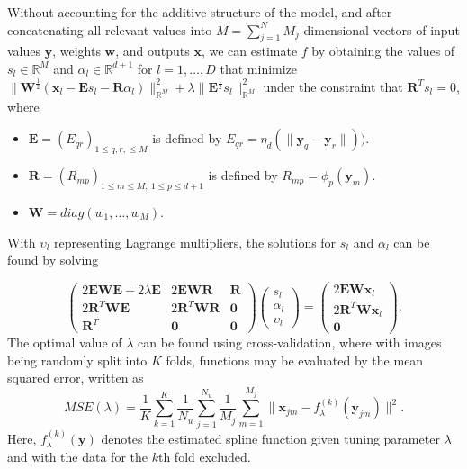 \documentclass[11pt,reqno]{article}
\theoremstyle{definition}
\begin{document}
Without accounting for the additive structure of the model, and after concatenating all relevant values into $M = \sum_{j=1}^{N}M_{j}$-dimensional vectors of input values $\mathbf{y}$, weights $\mathbf{w}$, and outputs $\mathbf{x}$, we can estimate $f$ by obtaining the values of $s_l \in \mathbb{R}^{M}$ and $\alpha_l \in \mathbb{R}^{d + 1}$ for $l = 1, \dots, D$ that minimize $\|\mathbf{W}^{\frac{1}{2}}\left(\mathbf{x}_{l} - \mathbf{E}s_l - \mathbf{R}\alpha_l\right)\|^2_{\mathbb{R}^{M}} + \lambda\|\mathbf{E}^{\frac{1}{2}}s_l\|^2_{\mathbb{R}^{M}}$ under the constraint that $\mathbf{R}^{T}s_l = 0$, where
\begin{itemize}
  \item $\mathbf{E} = (E_{qr})_{1 \leq q, r, \leq M}$ is defined by $E_{qr} = \eta_{d}\left(\|\mathbf{y}_{q} - \mathbf{y}_{r}\|\right))$.
  \item $\mathbf{R} = \left(R_{mp}\right)_{1 \leq m \leq M, \ 1 \leq p \leq d + 1}$ is defined by $R_{mp} = \phi_p(\mathbf{y}_{m})$.
  \item $\mathbf{W} = diag(w_{1}, \dots, w_{M})$.
\end{itemize}

With $\upsilon_l$ representing Lagrange multipliers, the solutions for $s_l$ and $\alpha_l$ can be found by solving

\begin{equation}
   \left(\begin{array}{ccc}
    2\mathbf{EWE} + 2\lambda\mathbf{E} & 2\mathbf{EWR} & \mathbf{R} \\
    2\mathbf{R}^{T}\mathbf{WE} & 2\mathbf{R}^{T}\mathbf{WR} & \mathbf{0} \\
    \mathbf{R}^{T} & \mathbf{0} & \mathbf{0}
  \end{array}\right)\left(
  \begin{array}{c}
    s_l \\
    \alpha_l \\
    \upsilon_l
  \end{array}
  \right) = \left(
  \begin{array}{c}
    2\mathbf{EW}\mathbf{x}_l \\
    2\mathbf{R}^{T}\mathbf{W}\mathbf{x}_l \\
    \mathbf{0}
  \end{array}
  \right). \label{eq:4}
\end{equation}
The optimal value of $\lambda$ can be found using cross-validation, where with images being randomly split into $K$ folds, functions may be evaluated by the mean squared error, written as
\begin{equation}
  MSE(\lambda) = \frac{1}{K}\sum_{k=1}^{K}\frac{1}{N_u}\sum_{j=1}^{N_u}\frac{1}{M_j}\sum_{m=1}^{M_j}\|\mathbf{x}_{jm} - f_{\lambda}^{(k)}(\mathbf{y}_{jm})\|^2. \label{eq:5}
\end{equation}
Here, $f_{\lambda}^{(k)}(\mathbf{y})$ denotes the estimated spline function given tuning parameter $\lambda$ and with the data for the $k$th fold excluded.
\end{document}
